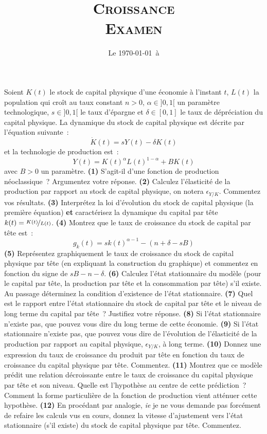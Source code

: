 \documentclass[10pt,a4paper,notitlepage]{article}
\newcommand{\question}[1]{\textbf{(#1)}}
\begin{document}
\title{\textsc{Croissance\\ \small{Examen}}}
\date{Le \today\ à \thistime}

\maketitle

Soient $K(t)$ le stock de capital physique d'une économie à l'instant
$t$, $L(t)$ la population qui croît au taux constant $n>0$,
$\alpha\in]0,1[$ un paramètre technologique, $s\in]0,1[$ le taux
d'épargne et $\delta\in[0,1]$ le taux de dépréciation du capital
physique. La dynamique du stock de capital physique est décrite par
l'équation suivante :
\[
\dot K(t) = sY(t)-\delta K(t)
\]
et la technologie de production est :
\[
Y(t) = K(t)^\alpha L(t)^{1-\alpha} + BK(t)
\]
avec $B>0$ un paramètre. \question{1} S'agit-il d'une fonction de production
néoclassique ? Argumentez votre réponse. \question{2} Calculez l'élasticité de
la production par rapport au stock de capital physique, on notera
$\epsilon_{Y/K}$. Commentez vos résultats. \question{3} Interprétez la loi
d'évolution du stock de capital physique (la première équation) \textbf{et}
caractérisez la dynamique du capital par tête $k(t)=\nicefrac{K(t)}{L(t)}$.
\question{4} Montrez que le taux de croissance du stock de capital par tête
est~:
\[
g_k(t) = s k(t)^{\alpha-1}-(n+\delta-sB)
\]
\question{5} Représentez graphiquement le taux de croissance du stock de capital
physique par tête (en expliquant la construction du graphique) et commentez en
fonction du signe de $sB-n-\delta$. \question{6} Calculez l'état stationnaire du
modèle (pour le capital par tête, la production par tête et la consommation par
tête) s'il existe. Au passage déterminez la condition d'existence de l'état
stationnaire. \question{7} Quel est le rapport entre l'état stationnaire du
stock de capital par tête et le niveau de long terme du capital par tête ?
Justifiez votre réponse. \question{8} Si l'état stationnaire n'existe pas, que
pouvez vous dire du long terme de cette économie. \question{9} Si l'état
stationnaire n'existe pas, que pouvez vous dire de l'évolution de l'élasticité
de la production par rapport au capital physique, $\epsilon_{Y/K}$, à long
terme. \question{10} Donnez une expression du taux de croissance du produit par
tête en fonction du taux de croissance du capital physique par tête. Commentez.
\question{11} Montrez que ce modèle prédit une relation décroissante entre le
taux de croissance du capital physique par tête et son niveau. Quelle est
l'hypothèse au centre de cette prédiction ? Comment la forme particulière de la
fonction de production vient atténuer cette hypothèse. \question{12} En
procédant par analogie, \emph{ie} je ne vous demande pas forcément de refaire les calculs
vus en cours, donnez la vitesse d'ajustement vers l'état stationnaire (s'il
existe) du stock de capital physique par tête. Commentez.
\end{document}
